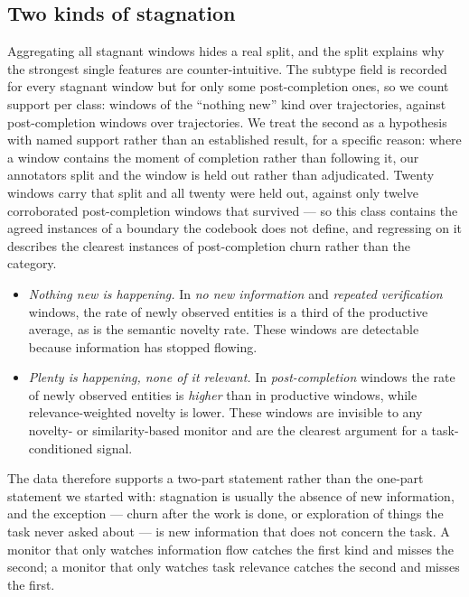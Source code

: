 \subsection{Two kinds of stagnation}
\label{sec:res-subtypes}
Aggregating all stagnant windows hides a real split, and the split explains why the strongest single
features are counter-intuitive. The subtype field is recorded for every \pannLabelStagnant{} stagnant
window but for only some post-completion ones, so we count support per class: \pannSubNothingNew{} windows
of the ``nothing new'' kind over \pannSubNothingNewTraj{} trajectories, against
\pannLabelDoneRedundant{} post-completion windows over \pannSubPostCompletionTraj{} trajectories. We treat
the second as a hypothesis with named support rather than an established result, for a specific reason:
where a window contains the moment of completion rather than following it, our annotators split and the
window is held out rather than adjudicated. Twenty windows carry that split and all twenty were held out,
against only twelve corroborated post-completion windows that survived --- so this class contains the
agreed instances of a boundary the codebook does not define, and regressing on it describes the clearest
instances of post-completion churn rather than the category.

\begin{itemize}[leftmargin=1.2em,itemsep=2pt,topsep=2pt]
\item \emph{Nothing new is happening.} In \emph{no new information} and \emph{repeated verification}
windows, the rate of newly observed entities is a third of the productive average, as is the semantic
novelty rate. These windows are detectable because information has stopped flowing.
\item \emph{Plenty is happening, none of it relevant.} In \emph{post-completion} windows the rate of newly
observed entities is \emph{higher} than in productive windows, while relevance-weighted novelty is lower.
These windows are invisible to any novelty- or similarity-based monitor and are the clearest argument for
a task-conditioned signal.
\end{itemize}

The data therefore supports a two-part statement rather than the one-part statement we started with:
stagnation is usually the absence of new information, and the exception --- churn after the work is done,
or exploration of things the task never asked about --- is new information that does not concern the task.
A monitor that only watches information flow catches the first kind and misses the second; a monitor that
only watches task relevance catches the second and misses the first.

